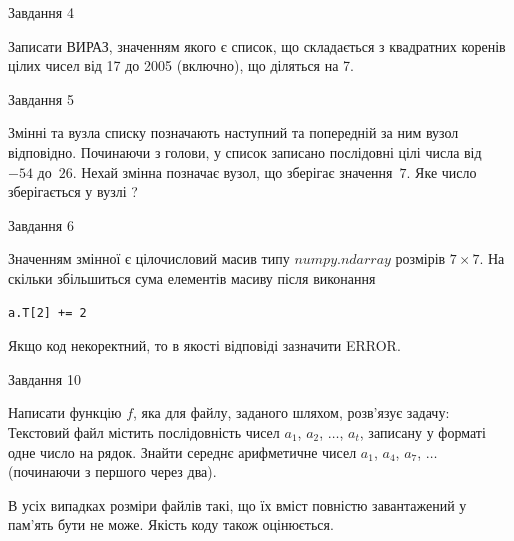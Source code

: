 \documentclass[12pt, ukrainian]{article}
\begin{document}
{               
{\begin{center}Завдання {4}\end{center}}
\vspace{-6mm}

Записати ВИРАЗ, значенням якого є список, що складається з квадратних коренів цілих чисел від 17 до 2005 (включно), що діляться на 7.\par

\vspace{10mm}
               
{\begin{center}Завдання {5}\end{center}}
\vspace{-6mm}
Змінні  та  вузла списку позначають наступний та попередній за ним вузол відповідно. Починаючи з голови, у список записано послідовні цілі числа від~$-54$ до~$26$. Нехай змінна  позначає вузол, що зберігає значення~$7$.
Яке число зберігається у вузлі  ?\par

               
{\begin{center}Завдання {6}\end{center}}
\vspace{-6mm}
Значенням змінної  є цілочисловий масив типу $numpy.ndarray$ розмірів $7{\times}7$. На скільки збільшиться сума елементів масиву  після виконання
\begin{verbatim}
a.T[2] += 2
\end{verbatim}


Якщо код некоректний, то в якості відповіді зазначити ERROR.\par

               
{\begin{center}Завдання {10}\end{center}}
\vspace{-6mm}

Написати функцію $f$, яка для файлу, заданого шляхом, розв’язує задачу:\\ Текстовий файл містить послідовність чисел $a_1$, $a_2$, $\ldots$, $a_t$, записану у форматі одне число на рядок. Знайти середнє арифметичне чисел $a_1$, $a_4$, $a_7$, $\ldots$ (починаючи з першого через два).

В усіх випадках розміри файлів такі, що їх вміст повністю завантажений у пам'ять бути не може. Якість коду також оцінюється.



\vspace{10mm}\par

}
\end{document}
